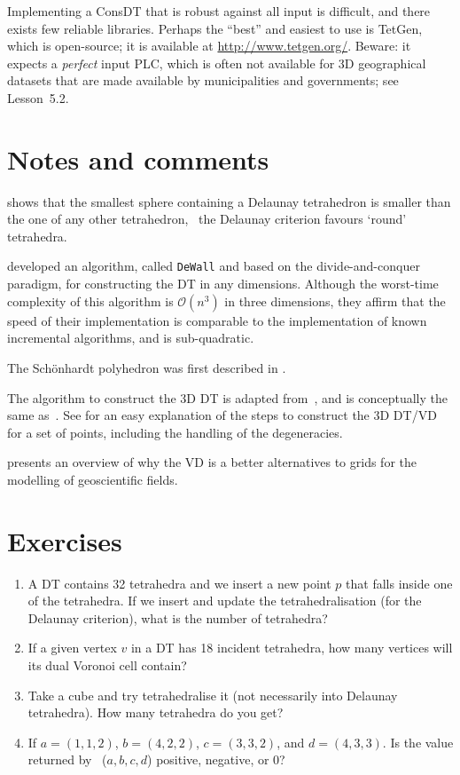 %

\newpage
\begin{kaobox}[frametitle=\faCog\ How does it work in practice?]
  Implementing a ConsDT that is robust against all input is difficult, and there exists few reliable libraries.
  Perhaps the ``best'' and easiest to use is TetGen, which is open-source; it is available at \url{http://www.tetgen.org/}.
  Beware: it expects a \emph{perfect} input PLC, which is often not available for 3D geographical datasets that are made available by municipalities and governments; see Lesson~5.2.
\end{kaobox}


%
\section{Notes and comments}

\citet{Rajan91} shows that the smallest sphere containing a Delaunay tetrahedron is smaller than the one of any other tetrahedron, \ie\ the Delaunay criterion favours `round' tetrahedra.

\citet{Cignoni98} developed an algorithm, called \texttt{DeWall} and based on the divide-and-conquer paradigm, for constructing the DT in any dimensions. Although the worst-time complexity of this algorithm is $\mathcal{O}(n^3)$ in three dimensions, they affirm that the speed of their implementation is comparable to the implementation of known incremental algorithms, and is sub-quadratic.

The Schönhardt polyhedron was first described in \citet{Schonhardt28}. 

The algorithm to construct the 3D DT is adapted from~\cite{Joe91}, and is conceptually the same as~\cite{Edelsbrunner96}. 
See \citet{Ledoux07} for an easy explanation of the steps to construct the 3D DT/VD for a set of points, including the handling of the degeneracies. 

\citet{Ledoux08} presents an overview of why the VD is a better alternatives to grids for the modelling of geoscientific fields.



%
\section{Exercises}

\begin{enumerate}
  \item A DT contains 32 tetrahedra and we insert a new point $p$ that falls inside one of the tetrahedra. If we insert and update the tetrahedralisation (for the Delaunay criterion), what is the number of tetrahedra?
  \item If a given vertex $v$ in a DT has 18 incident tetrahedra, how many vertices will its dual Voronoi cell contain?
  \item Take a cube and try tetrahedralise it (not necessarily into Delaunay tetrahedra). How many tetrahedra do you get?
  \item If $a = (1, 1, 2)$, $b = (4, 2, 2)$, $c = (3, 3, 2)$, and $d = (4, 3, 3)$. Is the value returned by \Orient~($a,b,c,d$) positive, negative, or 0?  
\end{enumerate}
